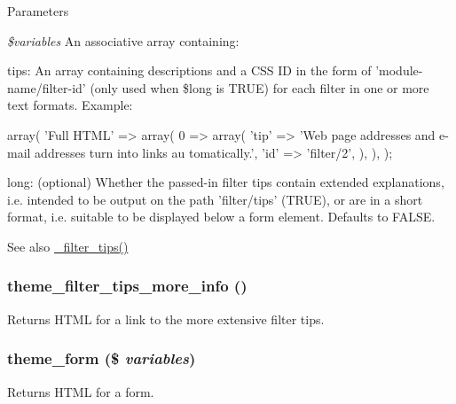 \begin{DoxyParams}{Parameters}
\item[{\em \$variables}]An associative array containing:
\begin{DoxyItemize}
\item tips: An array containing descriptions and a CSS ID in the form of 'module-\/name/filter-\/id' (only used when \$long is TRUE) for each filter in one or more text formats. Example: 
\begin{DoxyCode}
       array(
         'Full HTML' => array(
           0 => array(
             'tip' => 'Web page addresses and e-mail addresses turn into links au
      tomatically.',
             'id' => 'filter/2',
           ),
         ),
       );
\end{DoxyCode}

\item long: (optional) Whether the passed-\/in filter tips contain extended explanations, i.e. intended to be output on the path 'filter/tips' (TRUE), or are in a short format, i.e. suitable to be displayed below a form element. Defaults to FALSE.
\end{DoxyItemize}\end{DoxyParams}
\begin{DoxySeeAlso}{See also}
\hyperlink{filter_8module_a3b16812bade6a3a5fa942913150249b9}{\_\-filter\_\-tips()} 
\end{DoxySeeAlso}
\hypertarget{group__themeable_ga433eeac690ffb684b845d10b301fdbca}{
\subsubsection[{theme\_\-filter\_\-tips\_\-more\_\-info}]{\setlength{\rightskip}{0pt plus 5cm}theme\_\-filter\_\-tips\_\-more\_\-info ()}}
\label{group__themeable_ga433eeac690ffb684b845d10b301fdbca}
Returns HTML for a link to the more extensive filter tips. \hypertarget{group__themeable_ga8b9e6ce7a301b1e072f8e83525cd7ba6}{
\subsubsection[{theme\_\-form}]{\setlength{\rightskip}{0pt plus 5cm}theme\_\-form (\$ {\em variables})}}
\label{group__themeable_ga8b9e6ce7a301b1e072f8e83525cd7ba6}
Returns HTML for a form.


